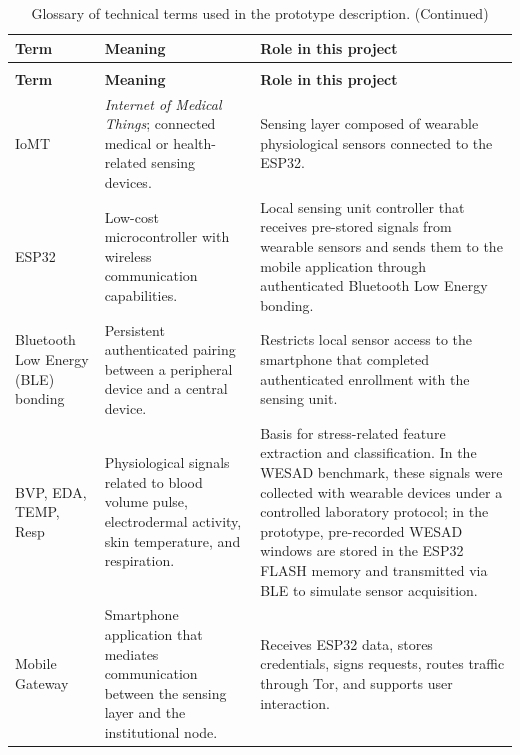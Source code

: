 \documentclass[12pt]{article}
\begin{document}
\begin{longtable}{p{2.5cm} p{4.7cm} p{6.4cm}}
\caption{Glossary of technical terms used in the prototype description.}
\label{tab:technical_terms_results} \\

\toprule
\textbf{Term} & \textbf{Meaning} & \textbf{Role in this project} \\ \midrule
\endfirsthead

\caption[]{Glossary of technical terms used in the prototype description. (Continued)} \\

\toprule
\textbf{Term} & \textbf{Meaning} & \textbf{Role in this project} \\ \midrule
\endhead

\bottomrule
\endfoot

IoMT & \textit{Internet of Medical Things}; connected medical or health-related sensing devices. & Sensing layer composed of wearable physiological sensors connected to the ESP32. \\ \midrule

ESP32 & Low-cost microcontroller with wireless communication capabilities. & Local sensing unit controller that receives pre-stored signals from wearable sensors and sends them to the mobile application through authenticated Bluetooth Low Energy bonding. \\ \midrule

Bluetooth Low Energy (BLE) bonding & Persistent authenticated pairing between a peripheral device and a central device. & Restricts local sensor access to the smartphone that completed authenticated enrollment with the sensing unit. \\ \midrule

BVP, EDA, TEMP, Resp & Physiological signals related to blood volume pulse, electrodermal activity, skin temperature, and respiration. & Basis for stress-related feature extraction and classification. In the WESAD benchmark, these signals were collected with wearable devices under a controlled laboratory protocol; in the prototype, pre-recorded WESAD windows are stored in the ESP32 FLASH memory and transmitted via BLE to simulate sensor acquisition. \\ \midrule

Mobile Gateway & Smartphone application that mediates communication between the sensing layer and the institutional node. & Receives ESP32 data, stores credentials, signs requests, routes traffic through Tor, and supports user interaction. \\ \midrule


\end{longtable}
\end{document}
